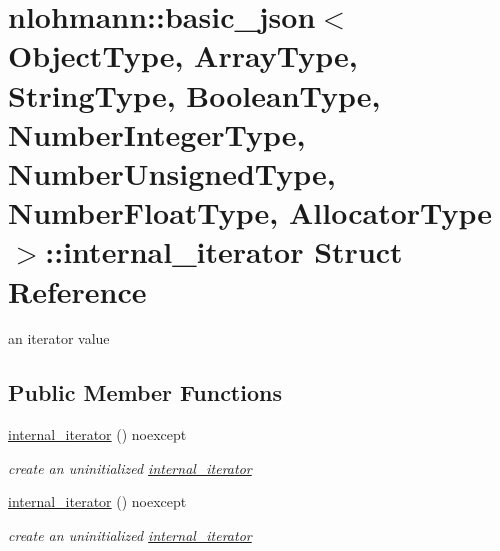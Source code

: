\hypertarget{structnlohmann_1_1basic__json_1_1internal__iterator}{\section{nlohmann\-:\-:basic\-\_\-json$<$ Object\-Type, Array\-Type, String\-Type, Boolean\-Type, Number\-Integer\-Type, Number\-Unsigned\-Type, Number\-Float\-Type, Allocator\-Type $>$\-:\-:internal\-\_\-iterator Struct Reference}
\label{structnlohmann_1_1basic__json_1_1internal__iterator}
}


an iterator value  


\subsection*{Public Member Functions}
\begin{DoxyCompactItemize}
\item 
\hypertarget{structnlohmann_1_1basic__json_1_1internal__iterator_af7975e4fd91cdfc156e81df7c3c40b2b_af7975e4fd91cdfc156e81df7c3c40b2b}{\hyperlink{structnlohmann_1_1basic__json_1_1internal__iterator_af7975e4fd91cdfc156e81df7c3c40b2b_af7975e4fd91cdfc156e81df7c3c40b2b}{internal\-\_\-iterator} () noexcept}\label{structnlohmann_1_1basic__json_1_1internal__iterator_af7975e4fd91cdfc156e81df7c3c40b2b_af7975e4fd91cdfc156e81df7c3c40b2b}

\begin{DoxyCompactList}\small\item\em create an uninitialized \hyperlink{structnlohmann_1_1basic__json_1_1internal__iterator}{internal\-\_\-iterator} \end{DoxyCompactList}\item 
\hypertarget{structnlohmann_1_1basic__json_1_1internal__iterator_af7975e4fd91cdfc156e81df7c3c40b2b_af7975e4fd91cdfc156e81df7c3c40b2b}{\hyperlink{structnlohmann_1_1basic__json_1_1internal__iterator_af7975e4fd91cdfc156e81df7c3c40b2b_af7975e4fd91cdfc156e81df7c3c40b2b}{internal\-\_\-iterator} () noexcept}\label{structnlohmann_1_1basic__json_1_1internal__iterator_af7975e4fd91cdfc156e81df7c3c40b2b_af7975e4fd91cdfc156e81df7c3c40b2b}

\begin{DoxyCompactList}\small\item\em create an uninitialized \hyperlink{structnlohmann_1_1basic__json_1_1internal__iterator}{internal\-\_\-iterator} \end{DoxyCompactList}\end{DoxyCompactItemize}

